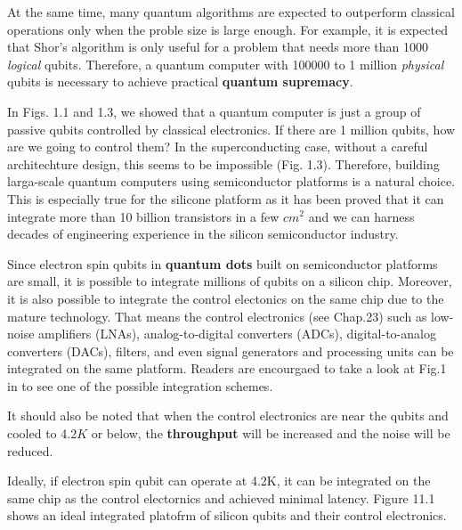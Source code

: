 \documentclass{article}
\begin{document}
At the same time, many quantum algorithms are expected to outperform classical operations
only when the proble size is large enough. For example, it is expected that Shor's 
algorithm is only useful for a problem that needs more than 1000 \textit{logical}
qubits. Therefore, a quantum computer with 100000 to 1 million \textit{physical} qubits
is necessary to achieve practical \textbf{quantum supremacy}.

In Figs. 1.1 and 1.3, we showed that a quantum computer is just a group of
passive qubits controlled by classical electronics. If there are 1 million qubits,
how are we going to control them? In the superconducting case, without a careful architechture
design, this seems to be impossible (Fig. 1.3). Therefore, building larga-scale quantum computers using
semiconductor platforms is a natural choice. This is  especially true for the silicone platform 
as it has been proved that it can integrate more than 10 billion transistors in a few $cm^2$ and we can
harness decades of engineering experience in the silicon semiconductor industry.

Since electron spin qubits in \textbf{quantum dots} built on semiconductor platforms are small, it is
possible to integrate millions of qubits on a silicon chip. Moreover,
it is also possible to integrate the control electonics on the same chip due to
the mature technology. That means the control electronics (see Chap.23) such as low-noise
amplifiers (LNAs), analog-to-digital converters (ADCs), digital-to-analog converters (DACs),
filters, and even signal generators and processing units can be integrated
on the same platform. Readers are encourgaed to take a look at Fig.1 in \cite{3peng2021cryogenic} to see one
of the possible integration schemes.

It should also be noted that when the control electronics are near the qubits and cooled to 4.2$K$ or
below, the \textbf{throughput} will be increased and the noise will be reduced.

Ideally, if electron spin qubit can operate at 4.2K, it can be integrated on the same
chip as the control electornics and achieved minimal latency. Figure 11.1 shows an ideal 
integrated platofrm of silicon qubits and their control electronics.\\
\end{document}
